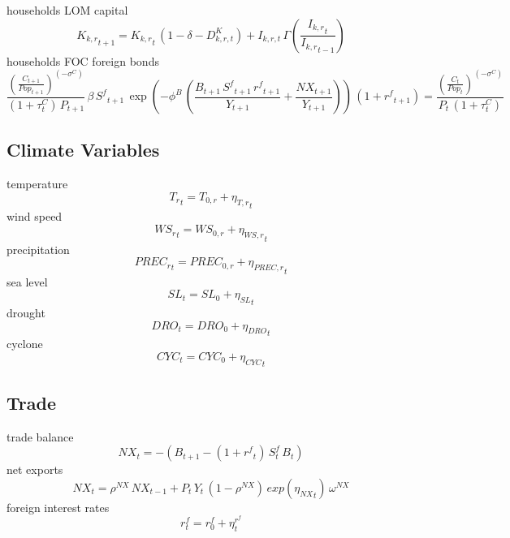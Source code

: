 households LOM capital
\begin{dmath}
{{K_{k,r}}_{t+1}}={{K_{k,r}}_{t}}\, \left(1-{{\delta}}-D^K_{k,r,t}\right) + I_{k,r,t} \, \Gamma\left(\frac{{{I_{k,r}}_{t}}}{{{I_{k,r}}_{t-1}}}\right)
\end{dmath}
households FOC foreign bonds
\begin{dmath}
\frac{\left(\frac{{C}_{t+1}}{{Pop}_{t+1}}\right)^{\left(-{{\sigma^{C}}}\right)}}{\left(1+{{\tau^{C}_{t}}}\right)\, {P}_{t+1}}\, {{\beta}}\, {S^{f}}_{t+1}\, \exp\left(-\phi^{B}\, \left(\frac{{B}_{t+1}\, {S^{f}}_{t+1}\, {{r^{f}}}_{t+1}}{{Y}_{t+1}}+\frac{{NX}_{t+1}}{{Y}_{t+1}}\right)\right)\, \left(1+{{r^{f}}}_{t+1}\right)=\frac{\left(\frac{{C}_{t}}{{Pop}_{t}}\right)^{\left(-{{\sigma^{C}}}\right)}}{{P}_{t}\, \left(1+{{\tau^{C}_{t}}}\right)}
\end{dmath}

\subsection{Climate Variables}
temperature
\begin{dmath}
{{T_{r}}_{t}}={{T_{0,r}}}+{{\eta_{T,r}}_{t}}
\end{dmath}
wind speed
\begin{dmath}
{{WS_{r}}_{t}}={{WS_{0,r}}}+{{\eta_{WS,r}}_{t}}
\end{dmath}
precipitation
\begin{dmath}
{{PREC_{r}}_{t}}={{PREC_{0,r}}}+{{\eta_{PREC,r}}_{t}}
\end{dmath}
sea level
\begin{dmath}
{{SL}_{t}}={{SL_0}}+{{\eta_{SL}}_{t}}
\end{dmath}
drought
\begin{dmath}
{{DRO}_{t}}={{DRO_0}}+{{\eta_{DRO}}_{t}}
\end{dmath}
cyclone
\begin{dmath}
{{CYC}_{t}}={{CYC_0}}+{{\eta_{CYC}}_{t}}
\end{dmath}

\subsection{Trade}
trade balance
\begin{dmath}
{NX_{t}}=-\left({B_{t+1}}-\left(1+{{r^{f}}_{t}}\right) \, S^{f}_{t} \, {B_{t}}\right)
\end{dmath}
net exports
\begin{dmath}
{NX_{t}}={{\rho^{NX}}}\, {NX_{t-1}}+{P_{t} \, Y_{t}}\, \left(1-{{\rho^{NX}}}\right)\, exp\left({{\eta_{NX}}_{t}}\right)\, {{\omega^{NX}}}
\end{dmath}
foreign interest rates
\begin{dmath}
r^{f}_{t} = r^{f}_{0} + \eta^{r^{f}}_t
\end{dmath}

